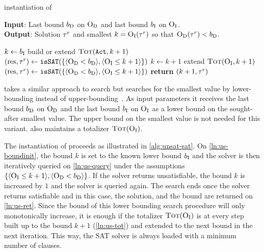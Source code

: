 \begin{algorithm}[t]
  \caption{\unsatsat{} instantiation of \Min{}}\label{alg:unsat-sat}
  \textbf{Input}: Last bound $b_{\text{D}}$ on $\textsc{O}_{\text{D}}$ and last bound $b_{\text{I}}$ on $\textsc{O}_{\text{I}}$. \\
  \textbf{Output}: Solution $\tau^r$ and smallest $k=\textsc{O}_{\text{I}}(\tau^r)$ so that $\textsc{O}_{\text{D}}(\tau^r)<b_{\text{D}}$.

  \begin{algorithmic}[1]
    \STATE $k \gets b_{\text{I}}$ \label{ln:us-boundinit}
    \STATE build or extend $\textsc{Tot}(\texttt{Act},k+1)$
    \STATE $(\text{res},\tau^r) \gets \texttt{isSAT}(\{\langle \textsc{O}_{\text{D}} < b_{\text{D}} \rangle, \langle \textsc{O}_{\text{I}} \leq k+1 \rangle\})$
    \WHILE{$\res = \unsat$}
      \STATE $k \gets k+1$
      \STATE extend $\textsc{Tot}(\textsc{O}_{\text{I}},k+1)$ \label{ln:us-tot}
      \STATE $(\text{res},\tau^r) \gets \texttt{isSAT}(\{\langle \textsc{O}_{\text{D}} < b_{\text{D}} \rangle, \langle \textsc{O}_{\text{I}} \leq k+1 \rangle\})$ \label{ln:us-query}
    \ENDWHILE
    \STATE \textbf{return} $(k+1,\tau^r)$ \label{ln:us-ret}
  \end{algorithmic}
\end{algorithm}

\unsatsat{} takes a similar approach to \satunsat{} search but searches for the smallest value by lower-bounding instead of upper-bounding~\autocite{DBLP:conf/sat/FuM06}.
As input parameters it receives the last bound $b_{\text{D}}$ on $\textsc{O}_{\text{D}}$ and the last bound $b_{\text{I}}$ on $\textsc{O}_{\text{I}}$ as a lower bound on the sought-after smallest value.
The upper bound on the smallest value is not needed for this variant.
\unsatsat{} also maintains a totalizer $\textsc{Tot}(\textsc{O}_{\text{I}})$.

The \unsatsat{} instantiation of \Min{} proceeds as illustrated in \cref{alg:unsat-sat}.
On \cref{ln:us-boundinit}, the bound $k$ is set to the known lower bound $b_{\text{I}}$ and the solver is then iteratively queried on \cref{ln:us-query} under the assumptions $\{ \langle \textsc{O}_{\text{I}} \leq k+1 \rangle, \langle \textsc{O}_{\text{D}} < b_{\text{D}} \rangle \}$.
If the solver returns unsatisfiable, the bound $k$ is increased by $1$ and the solver is queried again.
The search ends once the solver returns satisfiable and in this case, the solution, and the bound are returned on \cref{ln:us-ret}.
Since the bound of this lower bounding search procedure will only monotonically increase, it is enough if the totalizer $\textsc{Tot}(\textsc{O}_{\text{I}})$ is at every step built up to the bound $k+1$ (\cref{ln:us-tot}) and extended to the next bound in the next iteration.
This way, the SAT solver is always loaded with a minimum number of clauses.

